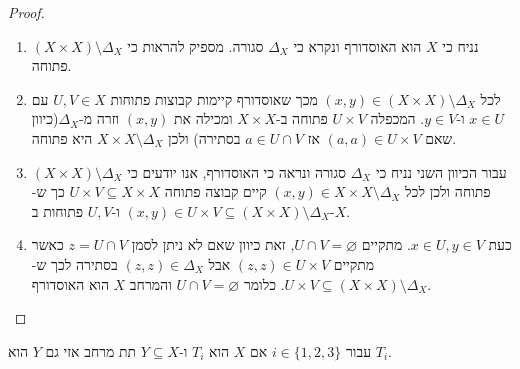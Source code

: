 \documentclass{tstextbook}
\begin{document}
\begin{proof}
  \begin{enumerate}
    \item נניח כי \(X\) הוא האוסדורף ונקרא כי \(\Delta_{X}\) סגורה. מספיק להראות כי \((X\times X)\setminus \Delta_{X}\) פתוחה.  


    \item לכל \((x,y)\in (X\times X)\setminus \Delta_{X}\) מכך שאוסדורף קיימות קבוצות פתוחות \(U,V \in X\) עם \(x \in U\) ו-\(y \in V\). המכפלה \(U\times V\) פתוחה ב-\(X \times X\) ומכילה את \((x,y)\) וזרה מ-\(\Delta _X\)(כיוון שאם \((a,a)\in U\times V\) אז \(a \in U \cap V\) בסתירה) ולכן \(X \times X \setminus \Delta _X\) היא פתוחה. 


    \item עבור הכיוון השני נניח כי \(\Delta_X\) סגורה ונראה כי האוסדורף, אנו יודעים כי \((X\times X)\setminus \Delta_{X}\) פתוחה ולכן לכל \((x,y )\in X\times X \setminus \Delta_{X}\) קיים קבוצה פתוחה \(U \times V \subseteq X \times X\) כך ש-\((x,y)\in U \times V\subseteq(X \times X)\setminus \Delta_{X}\) ו-\(U,V\) פתוחות ב-\(X\). 


    \item כעת \(x \in U,y \in V\). מתקיים \(U\cap V=\varnothing\), זאת כיוון שאם לא ניתן לסמן \(z = U \cap V\) כאשר מתקיים \((z,z )\in U\times V\) אבל \((z,z)\in \Delta _X\) בסתירה לכך ש-\(U\times V\subseteq (X\times X)\setminus \Delta_{X}\). כלומר \(U\cap V=\varnothing\) והמרחב \(X\) הוא האוסדורף. 


  \end{enumerate}
\end{proof}
\begin{proposition}
עבור \(i \in \{ 1,2,3 \}\) אם \(X\) הוא \(T_{i}\) ו-\(Y\subseteq X\) תת מרחב אזי גם \(Y\) הוא \(T_{i}\).

\end{proposition}
\end{document}
